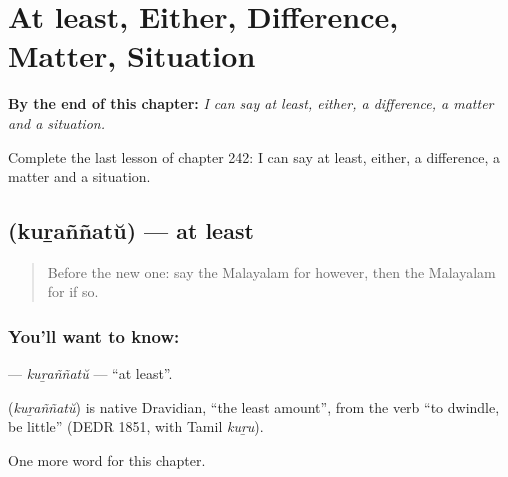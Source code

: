 
\chapter{At least, Either, Difference, Matter, Situation}
\label{ch:ml-at-least-either-difference-matter-situation}

\begin{chapteropening}
\textbf{By the end of this chapter:} \emph{I can say at least, either, a difference, a matter and a situation.}

Complete the last lesson of chapter 242: I can say at least, either, a difference, a matter and a situation.
\end{chapteropening}

\section[\texorpdfstring{\ml{കുറഞ്ഞത്} (kuṟaññatŭ)}{കുറഞ്ഞത് (kuṟaññatŭ)}]{ (kuṟaññatŭ) — at least}

\label{lesson:ML-C242-kurannatu}



\begin{quote}
Before the new one: say the Malayalam for however, then the Malayalam for if so.
\end{quote}

\subsection*{You'll want to know: }
\textbf{} — \emph{kuṟaññatŭ} — \textquotedblleft{}at least\textquotedblright{}.

\begin{cousinweb}
\textbf{} (\emph{kuṟaññatŭ}) is native Dravidian, \textquotedblleft{}the least amount\textquotedblright{}, from the verb \textquotedblleft{}to dwindle, be little\textquotedblright{} (DEDR 1851, with Tamil \emph{kuṟu}).
\end{cousinweb}

\begin{grammarlens}[title={What you've built}]
One more word for this chapter.
\end{grammarlens}

